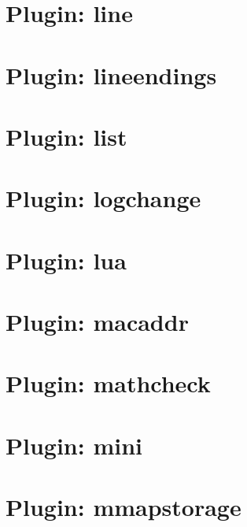 \let\mypdfximage\pdfximage\def\pdfximage{\immediate\mypdfximage}\documentclass[twoside]{book}
\newcommand{\+}{\discretionary{\mbox{\scriptsize$\hookleftarrow$}}{}{}}
\begin{document}
\chapter{Plugin\+: line}
\label{md_src_plugins_line_README}

\chapter{Plugin\+: lineendings}
\label{md_src_plugins_lineendings_README}

\chapter{Plugin\+: list}
\label{md_src_plugins_list_README}

\chapter{Plugin\+: logchange}
\label{md_src_plugins_logchange_README}

\chapter{Plugin\+: lua}
\label{md_src_plugins_lua_README}

\chapter{Plugin\+: macaddr}
\label{md_src_plugins_macaddr_README}

\chapter{Plugin\+: mathcheck}
\label{md_src_plugins_mathcheck_README}

\chapter{Plugin\+: mini}
\label{md_src_plugins_mini_README}

\chapter{Plugin\+: mmapstorage}
\label{md_src_plugins_mmapstorage_README}

\end{document}
